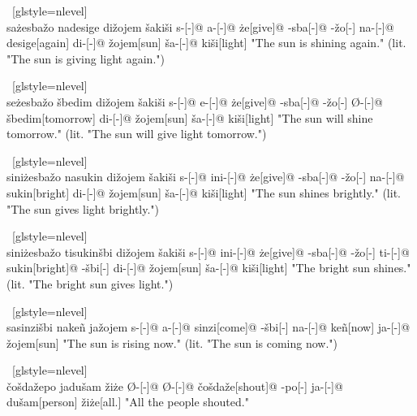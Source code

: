 \ex~[glstyle=nlevel]
\begingl
\glpreamble {} \\ sa\.{z}esba\v{z}o nadesige di\v{z}ojem \v{s}aki\v{s}i
\endpreamble
s-[{\Ind}-]@
a-[{\Prog}-]@
\.{z}e[give]@
-sba[-{\Inan}]@
-\v{z}o[-{\Inan}]
na-[{\Prog}-]@
desige[again]
di-[{\Erg}-]@
\v{z}ojem[sun]
\v{s}a-[{\Acc}-]@
ki\v{s}i[light]
\glft "The sun is shining again." (lit. "The sun is giving light again.")
\endgl
\xe

\ex~[glstyle=nlevel]
\begingl
\glpreamble {} \\ se\.{z}esba\v{z}o \v{s}bedim di\v{z}ojem \v{s}aki\v{s}i
\endpreamble
s-[{\Ind}-]@
e-[{\Pfv}-]@
\.{z}e[give]@
-sba[-{\Inan}]@
-\v{z}o[-{\Inan}]
Ø-[{\Pfv}-]@
\v{s}bedim[tomorrow]
di-[{\Erg}-]@
\v{z}ojem[sun]
\v{s}a-[{\Acc}-]@
ki\v{s}i[light]
\glft "The sun will shine tomorrow." (lit. "The sun will give light tomorrow.")
\endgl
\xe

\ex~[glstyle=nlevel]
\begingl
\glpreamble {} \\ sini\.{z}esba\v{z}o nasukin di\v{z}ojem \v{s}aki\v{s}i
\endpreamble
s-[{\Ind}-]@
ini-[{\Hab}-]@
\.{z}e[give]@
-sba[-{\Inan}]@
-\v{z}o[-{\Inan}]
na-[{\Prog}-]@
sukin[bright]
di-[{\Erg}-]@
\v{z}ojem[sun]
\v{s}a-[{\Acc}-]@
ki\v{s}i[light]
\glft "The sun shines brightly." (lit. "The sun gives light brightly.")
\endgl
\xe

\ex~[glstyle=nlevel]
\begingl 
\glpreamble {} \\ sini\.{z}esba\v{z}o tisukin\v{s}bi di\v{z}ojem \v{s}aki\v{s}i
\endpreamble
s-[{\Ind}-]@
ini-[{\Hab}-]@
\.{z}e[give]@
-sba[-{\Inan}]@
-\v{z}o[-{\Inan}]
ti-[{\Erg}-]@
sukin[bright]@
-\v{s}bi[-{\Inan}]
di-[{\Erg}-]@
\v{z}ojem[sun]
\v{s}a-[{\Acc}-]@
ki\v{s}i[light]
\glft "The bright sun shines." (lit. "The bright sun gives light.")
\endgl
\xe

\ex~[glstyle=nlevel]
\begingl
\glpreamble {} \\ sasinzi\v{s}bi nakeñ ja\v{z}ojem
\endpreamble
s-[{\Ind}-]@
a-[{\Prog}-]@
sinzi[come]@
-\v{s}bi[-{\Inan}]
na-[{\Prog}-]@
keñ[now]
ja-[{\Nom}-]@
\v{z}ojem[sun]
\glft "The sun is rising now." (lit. "The sun is coming now.")
\endgl
\xe

\ex~[glstyle=nlevel]
\begingl 
\glpreamble {} \\ \v{c}o\v{s}da\v{z}epo jadu\v{s}am \v{z}i\.{z}e
\endpreamble
Ø-[{\Ind}-]@
Ø-[{\Pfv}-]@
\v{c}o\v{s}da\v{z}e[shout]@
-po[-{\Hg}]
ja-[{\Nom}-]@
du\v{s}am[person]
\v{z}i\.{z}e[all.{\Hg}]
\glft "All the people shouted."
\endgl
\xe

